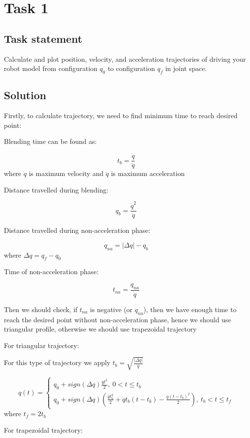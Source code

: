 \section*{Task 1}

\subsection*{Task statement}
Calculate and plot position, velocity, and acceleration trajectories of driving your robot model from configuration $q_0$ to configuration $q_f$ in joint space. 

\subsection*{Solution}

Firstly, to calculate trajectory, we need to find minimum time to reach desired point:

Blending time can be found as:

$$t_b = \frac{\dot q}{\ddot q}$$
where $\dot q$ is maximum velocity and $\ddot q$ is maximum acceleration

Distance travelled during blending:

$$q_b = \frac{\dot q^2}{\ddot q}$$

Distance travelled during non-acceleration phase:

$$q_{na} = |\Delta q| - q_b$$
where $\Delta q = q_f - q_0$

Time of non-acceleration phase:

$$t_{na} = \frac{q_{na}}{\dot q}$$

Then we should check, if $t_{na}$ is negative (or $q_{na}$), then we have enough time to reach the desired point without non-acceleration phase, hence we should use triangular profile, otherwise we should use trapezoidal trajectory

For triangular trajectory:

For this type of trajectory we apply $t_b = \sqrt{\frac{|\Delta q|}{\ddot q}}$

$$
q(t) = 
\begin{cases}
    q_0 + sign(\Delta q) \frac{\ddot q t^2}{2},\ 0 < t \leq t_b \\
    q_0 + sign(\Delta q) (\frac{\ddot q t_b^2}{2} + \ddot q t_b (t - t_b) - \frac{\ddot q (t - t_b)^2}{2}),\ t_b < t \leq t_f
\end{cases}
$$
where $t_f = 2t_b$

For trapezoidal trajectory:

